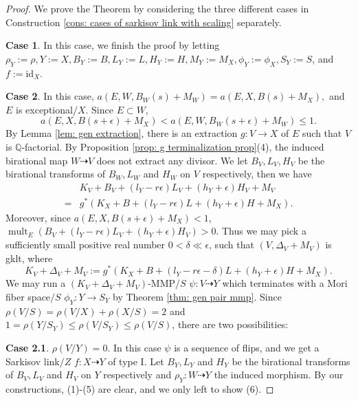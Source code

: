 \documentclass[11pt]{amsart}
\numberwithin{equation}{section}
\newcommand{\id}{\mathrm{id}}
\newcommand{\Qq}{\mathbb{Q}}
\newcommand{\mult}{\operatorname{mult}}
\theoremstyle{definition}
\theoremstyle{remark}
\theoremstyle{definition}
\begin{document}
\begin{proof}

We prove the Theorem by considering the three different cases in Construction \ref{cons: cases of sarkisov link with scaling} separately.

\medskip

\noindent\textbf{Case 1}. In this case, we finish the proof by letting $\rho_Y:=\rho, Y:=X, B_Y:=B, L_Y:=L, H_Y:=H, M_Y:=M_X, \phi_Y:=\phi_X, S_Y:=S$, and $f:=\id_X$.

\medskip

\noindent\textbf{Case 2}. In this case, $a(E,W,B_W(s)+M_W)=a(E,X,B(s)+M_X),$ and $E$ is exceptional$/X$. Since $E\subset W$, $$a(E,X,B(s+\epsilon)+M_X)<a(E,W,B_W(s+\epsilon)+M_W)\leq 1.$$
By Lemma \ref{lem: gen extraction}, there is an extraction $g: V\rightarrow X$ of $E$ such that $V$ is $\Qq$-factorial. By Proposition \ref{prop: g terminalization prop}(4), the induced birational map $W\dashrightarrow V$ does not extract any divisor. We let $B_V,L_V,H_V$ be the birational transforms of $B_W,L_W$ and $H_W$ on $V$ respectively, then we have
\begin{align*}
    &K_V+B_V+(l_Y-r\epsilon)L_V+(h_Y+\epsilon)H_V+M_V\\
    =&g^*(K_X+B+(l_Y-r\epsilon)L+(h_Y+\epsilon)H+M_X).
\end{align*}
Moreover, since $a(E,X,B(s+\epsilon)+M_X)<1$, $\mult_E(B_V+(l_Y-r\epsilon)L_V+(h_Y+\epsilon)H_V)>0$. Thus we may pick a sufficiently small positive real number $0<\delta\ll\epsilon$, such that 
$(V,\Delta_V+M_V)$ is gklt, where
$$K_V+\Delta_V+M_V:=g^*(K_X+B+(l_Y-r\epsilon-\delta)L+(h_Y+\epsilon)H+M_X).$$
We may run a $(K_V+\Delta_V+M_V)$-MMP$/S$ $\psi: V\dashrightarrow Y$ which terminates with a Mori fiber space$/S$ $\phi_Y: Y\rightarrow S_Y$ by Theorem \ref{thm: gen pair mmp}. Since $\rho(V/S)=\rho(V/X)+\rho(X/S)=2$ and $1=\rho(Y/S_Y)\leq\rho(V/S_Y)\leq\rho(V/S)$, there are two possibilities:

\medskip

\noindent\textbf{Case 2.1}. $\rho(V/Y)=0$. In this case $\psi$ is a sequence of flips, and we get a Sarkisov link$/Z$ $f:X\dashrightarrow Y$ of type I. Let $B_Y,L_Y$ and $H_Y$ be the birational transforms of $B_V,L_V$ and $H_V$ on $Y$ respectively and $\rho_Y: W\dashrightarrow Y$ the induced morphism. By our constructions, (1)-(5) are clear, and we only left to show (6).


\end{proof}
\end{document}
